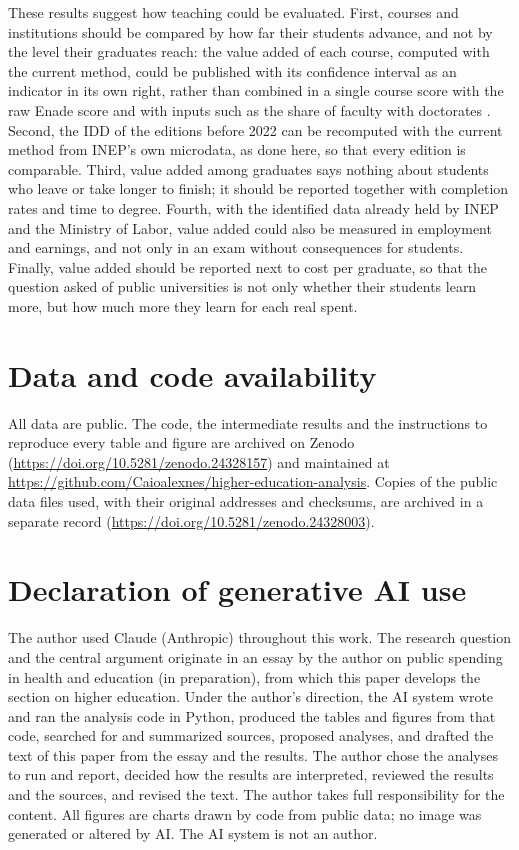\documentclass[11pt,a4paper]{article}
\begin{document}
These results suggest how teaching could be evaluated. First, courses and institutions should be compared by how far their students advance, and not by the level their graduates reach: the value added of each course, computed with the current method, could be published with its confidence interval as an indicator in its own right, rather than combined in a single course score with the raw Enade score and with inputs such as the share of faculty with doctorates \citep{inep2023cpc}. Second, the IDD of the editions before 2022 can be recomputed with the current method from INEP's own microdata, as done here, so that every edition is comparable. Third, value added among graduates says nothing about students who leave or take longer to finish; it should be reported together with completion rates and time to degree. Fourth, with the identified data already held by INEP and the Ministry of Labor, value added could also be measured in employment and earnings, and not only in an exam without consequences for students. Finally, value added should be reported next to cost per graduate, so that the question asked of public universities is not only whether their students learn more, but how much more they learn for each real spent.

\section*{Data and code availability}
All data are public. The code, the intermediate results and the instructions to reproduce every table and figure are archived on Zenodo (\url{https://doi.org/10.5281/zenodo.24328157}) and maintained at \url{https://github.com/Caioalexnes/higher-education-analysis}. Copies of the public data files used, with their original addresses and checksums, are archived in a separate record (\url{https://doi.org/10.5281/zenodo.24328003}).

\section*{Declaration of generative AI use}
The author used Claude (Anthropic) throughout this work. The research question and the central argument originate in an essay by the author on public spending in health and education (in preparation), from which this paper develops the section on higher education. Under the author's direction, the AI system wrote and ran the analysis code in Python, produced the tables and figures from that code, searched for and summarized sources, proposed analyses, and drafted the text of this paper from the essay and the results. The author chose the analyses to run and report, decided how the results are interpreted, reviewed the results and the sources, and revised the text. The author takes full responsibility for the content. All figures are charts drawn by code from public data; no image was generated or altered by AI. The AI system is not an author.
\end{document}
